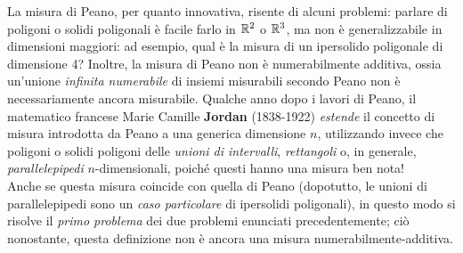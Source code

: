 La misura di Peano, per quanto innovativa, risente di alcuni problemi: parlare di poligoni o solidi poligonali è facile farlo in $\mathbb{R}^2$ o $\mathbb{R}^3$, ma non è generalizzabile in dimensioni maggiori: ad esempio, qual è la misura di un ipersolido poligonale di dimensione 4? Inoltre, la misura di Peano non è numerabilmente additiva, ossia un'unione \textit{infinita numerabile} di insiemi misurabili secondo Peano non è necessariamente ancora misurabile.
Qualche anno dopo i lavori di Peano, il matematico francese Marie Camille \textbf{Jordan} (1838-1922) \textit{estende} il concetto di misura introdotta da Peano a una generica dimensione $n$, utilizzando invece che poligoni o solidi poligoni delle \textit{unioni di intervalli}, \textit{rettangoli} o, in generale, \textit{parallelepipedi} $n$-dimensionali, poiché questi hanno una misura ben nota!\\
Anche se questa misura coincide con quella di Peano (dopotutto, le unioni di parallelepipedi sono un \textit{caso particolare} di ipersolidi poligonali), in questo modo si risolve il \textit{primo problema} dei due problemi enunciati precedentemente; ciò nonostante, questa definizione non è ancora una misura numerabilmente-additiva.
